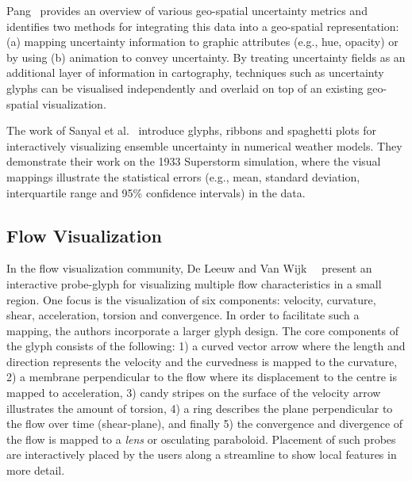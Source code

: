 Pang~\cite{pang01uncertaintyGeospatial} provides an overview of various geo-spatial uncertainty metrics and identifies two methods for integrating this data into a geo-spatial representation: (a) mapping uncertainty information to graphic attributes (e.g., hue, opacity) or by using (b) animation to convey uncertainty.
By treating uncertainty fields as an additional layer of information in cartography, techniques such as uncertainty glyphs can be visualised independently and overlaid on top of an existing geo-spatial visualization.

The work of Sanyal et al.~\cite{sanyal10} introduce glyphs, ribbons and spaghetti plots for interactively visualizing ensemble uncertainty in numerical weather models. They demonstrate their work on the 1933 Superstorm simulation, where the visual mappings illustrate the statistical errors (e.g., mean, standard deviation, interquartile range and 95\% confidence intervals) in the data.

\subsection{Flow Visualization}


In the flow visualization community, De Leeuw and Van Wijk~~\cite{deLeeuwVanWijk93probe} present an interactive probe-glyph for visualizing multiple flow characteristics in a small region.
One focus is the visualization of six components: velocity, curvature, shear, acceleration, torsion and convergence.
In order to facilitate such a mapping, the authors incorporate a larger glyph design.
The core components of the glyph consists of the following: 1) a curved vector arrow where the length and direction represents the velocity and the curvedness is mapped to the curvature, 2) a membrane perpendicular to the flow where its displacement to the centre is mapped to acceleration, 3) candy stripes on the surface of the velocity arrow illustrates the amount of torsion, 4) a ring describes the plane perpendicular to the flow over time (shear-plane), and finally 5) the convergence and divergence of the flow is mapped to a \emph{lens} or osculating paraboloid. Placement of such probes are interactively placed by the users along a streamline to show local features in more detail. 

